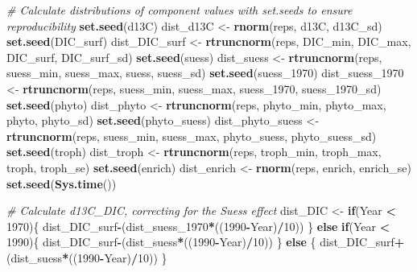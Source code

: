 \documentclass[]{article}
\newenvironment{Shaded}{\begin{snugshade}}{\end{snugshade}}
\newcommand{\CommentTok}[1]{\textcolor[rgb]{0.56,0.35,0.01}{\textit{#1}}}
\newcommand{\ControlFlowTok}[1]{\textcolor[rgb]{0.13,0.29,0.53}{\textbf{#1}}}
\newcommand{\DecValTok}[1]{\textcolor[rgb]{0.00,0.00,0.81}{#1}}
\newcommand{\KeywordTok}[1]{\textcolor[rgb]{0.13,0.29,0.53}{\textbf{#1}}}
\newcommand{\NormalTok}[1]{#1}
\newcommand{\OperatorTok}[1]{\textcolor[rgb]{0.81,0.36,0.00}{\textbf{#1}}}
\newcommand{\StringTok}[1]{\textcolor[rgb]{0.31,0.60,0.02}{#1}}
\begin{document}
\begin{Shaded}
\begin{Highlighting}[]
  \CommentTok{# Calculate distributions of component values with set.seeds to ensure reproducibility}
  \KeywordTok{set.seed}\NormalTok{(d13C)}
\NormalTok{  dist_d13C <-}\StringTok{ }\KeywordTok{rnorm}\NormalTok{(reps, d13C, d13C_sd)}
  \KeywordTok{set.seed}\NormalTok{(DIC_surf)}
\NormalTok{  dist_DIC_surf <-}\StringTok{ }\KeywordTok{rtruncnorm}\NormalTok{(reps, DIC_min, DIC_max, DIC_surf, DIC_surf_sd)}
  \KeywordTok{set.seed}\NormalTok{(suess)}
\NormalTok{  dist_suess <-}\StringTok{ }\KeywordTok{rtruncnorm}\NormalTok{(reps, suess_min, suess_max, suess, suess_sd)}
  \KeywordTok{set.seed}\NormalTok{(suess_}\DecValTok{1970}\NormalTok{)}
\NormalTok{  dist_suess_}\DecValTok{1970}\NormalTok{ <-}\StringTok{ }\KeywordTok{rtruncnorm}\NormalTok{(reps, suess_min, suess_max, suess_}\DecValTok{1970}\NormalTok{, suess_}\DecValTok{1970}\NormalTok{_sd)}
  \KeywordTok{set.seed}\NormalTok{(phyto)}
\NormalTok{  dist_phyto <-}\StringTok{ }\KeywordTok{rtruncnorm}\NormalTok{(reps, phyto_min, phyto_max, phyto, phyto_sd)}
  \KeywordTok{set.seed}\NormalTok{(phyto_suess)}
\NormalTok{  dist_phyto_suess <-}\StringTok{ }\KeywordTok{rtruncnorm}\NormalTok{(reps, suess_min, suess_max, phyto_suess, phyto_suess_sd)}
  \KeywordTok{set.seed}\NormalTok{(troph)}
\NormalTok{  dist_troph <-}\StringTok{ }\KeywordTok{rtruncnorm}\NormalTok{(reps, troph_min, troph_max, troph, troph_se)}
  \KeywordTok{set.seed}\NormalTok{(enrich)}
\NormalTok{  dist_enrich <-}\StringTok{ }\KeywordTok{rnorm}\NormalTok{(reps, enrich, enrich_se)}
  \KeywordTok{set.seed}\NormalTok{(}\KeywordTok{Sys.time}\NormalTok{())}
  
  \CommentTok{# Calculate d13C_DIC, correcting for the Suess effect}
\NormalTok{  dist_DIC <-}\StringTok{ }\ControlFlowTok{if}\NormalTok{(Year }\OperatorTok{<}\StringTok{ }\DecValTok{1970}\NormalTok{)\{}
\NormalTok{    dist_DIC_surf}\OperatorTok{-}\NormalTok{(dist_suess_}\DecValTok{1970}\OperatorTok{*}\NormalTok{((}\DecValTok{1990}\OperatorTok{-}\NormalTok{Year)}\OperatorTok{/}\DecValTok{10}\NormalTok{))}
\NormalTok{  \} }\ControlFlowTok{else} \ControlFlowTok{if}\NormalTok{(Year }\OperatorTok{<}\StringTok{ }\DecValTok{1990}\NormalTok{)\{}
\NormalTok{    dist_DIC_surf}\OperatorTok{-}\NormalTok{(dist_suess}\OperatorTok{*}\NormalTok{((}\DecValTok{1990}\OperatorTok{-}\NormalTok{Year)}\OperatorTok{/}\DecValTok{10}\NormalTok{))}
\NormalTok{  \} }\ControlFlowTok{else}\NormalTok{ \{}
\NormalTok{    dist_DIC_surf}\OperatorTok{+}\NormalTok{(dist_suess}\OperatorTok{*}\NormalTok{((}\DecValTok{1990}\OperatorTok{-}\NormalTok{Year)}\OperatorTok{/}\DecValTok{10}\NormalTok{))}
\NormalTok{  \}}
  

\end{Highlighting}
\end{Shaded}
\end{document}
